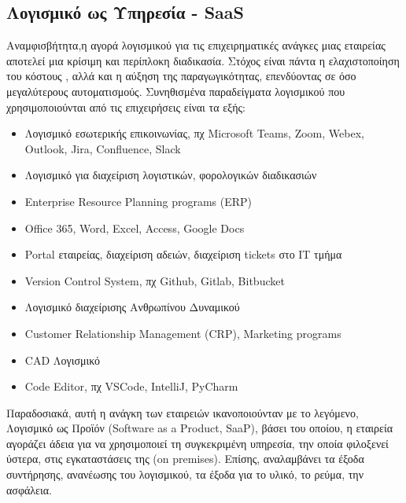 \documentclass{article}
\begin{document}
\subsection{Λογισμικό ως Υπηρεσία -
SaaS}
Αναμφισβήτητα,η αγορά λογισμικού για τις επιχειρηματικές ανάγκες μιας
εταιρείας αποτελεί μια κρίσιμη και περίπλοκη διαδικασία. Στόχος είναι
πάντα η ελαχιστοποίηση του κόστους , αλλά και η αύξηση της
παραγωγικότητας, επενδύοντας σε όσο μεγαλύτερους αυτοματισμούς.
Συνηθισμένα παραδείγματα λογισμικού που χρησιμοποιούνται από τις
επιχειρήσεις είναι τα εξής:
\begin{itemize}
  \item Λογισμικό εσωτερικής επικοινωνίας, πχ 
Microsoft Teams, Zoom, Webex, Outlook, Jira, Confluence,
Slack
  \item Λογισμικό για διαχείριση λογιστικών, φορολογικών διαδικασιών
  \item {} Enterprise Resource Planning programs (ERP)
  \item Office 365, Word, Excel, Access, Google Docs
  \item Portal  εταιρείας, διαχείριση αδειών,
διαχείριση tickets στο ΙΤ
τμήμα 
  \item Version Control System, πχ
Github, Gitlab, Bitbucket 
  \item Λογισμικό διαχείρισης Ανθρωπίνου Δυναμικού 
  \item Customer Relationship Management (CRP), Marketing programs
  \item CAD Λογισμικό
  \item Code Editor, πχ
VSCode, IntelliJ, PyCharm
\end{itemize}
Παραδοσιακά, αυτή η ανάγκη των εταιρειών ικανοποιούνταν με το λεγόμενο,
Λογισμικό ως Προϊόν (Software as a Product, SaaP),
βάσει του οποίου, η εταιρεία αγοράζει άδεια για να
χρησιμοποιεί τη συγκεκριμένη υπηρεσία, την οποία φιλοξενεί ύστερα, στις
εγκαταστάσεις της (on
premises). Επίσης, αναλαμβάνει τα έξοδα συντήρησης,
ανανέωσης του λογισμικού, τα έξοδα για το υλικό, το ρεύμα, την ασφάλεια.
\\ \\
\end{document}
